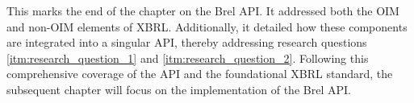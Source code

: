 
This marks the end of the chapter on the Brel API.
It addressed both the OIM and non-OIM elements of XBRL.
Additionally, it detailed how these components are integrated into a singular API, thereby addressing research questions \ref{itm:research_question_1} and \ref{itm:research_question_2}.
Following this comprehensive coverage of the API and the foundational XBRL standard, the subsequent chapter will focus on the implementation of the Brel API.